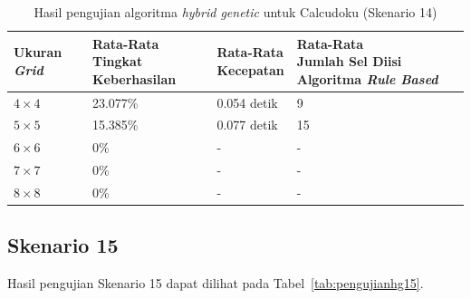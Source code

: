 \begin{table}
\centering
\captionsetup{justification=centering}
\caption[Hasil pengujian algoritma \textit{hybrid genetic} untuk Calcudoku (Skenario 14)]{Hasil pengujian algoritma \textit{hybrid genetic} untuk Calcudoku (Skenario 14)}
\begin{tabular}{| l | l | l | l |}
\hline
Ukuran \textit{Grid} & \makecell[l]{Rata-Rata \\ Tingkat Keberhasilan} & \makecell[l]{Rata-Rata \\ Kecepatan} & \makecell[l]{Rata-Rata \\ Jumlah Sel Diisi Algoritma \textit{Rule Based}} \\
\hline \hline
\begin{math}4 \times 4\end{math} & 23.077\% & 0.054 detik & 9 \\
\hline
\begin{math}5 \times 5\end{math} & 15.385\% & 0.077 detik & 15 \\
\hline
\begin{math}6 \times 6\end{math} & 0\% & - & - \\
\hline
\begin{math}7 \times 7\end{math} & 0\% & - & - \\
\hline
\begin{math}8 \times 8\end{math} & 0\% & - & - \\
\hline
\end{tabular}
\label{tab:pengujianhg14}
\end{table}

\subsection{Skenario 15}
\label{sec:skenario15}

Hasil pengujian Skenario 15 dapat dilihat pada Tabel~\ref{tab:pengujianhg15}.

